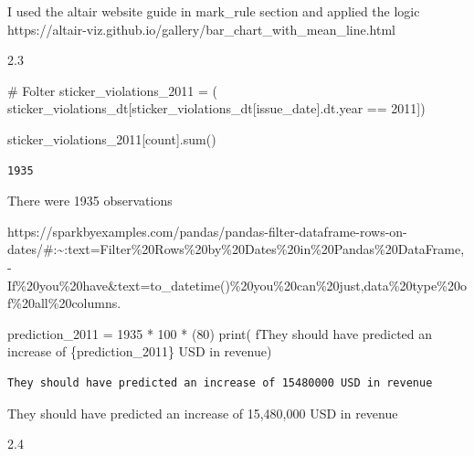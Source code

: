 \documentclass[
  letterpaper,
  DIV=11,
  numbers=noendperiod]{scrartcl}
\newenvironment{Shaded}{\begin{snugshade}}{\end{snugshade}}
\newcommand{\BuiltInTok}[1]{\textcolor[rgb]{0.00,0.23,0.31}{#1}}
\newcommand{\CommentTok}[1]{\textcolor[rgb]{0.37,0.37,0.37}{#1}}
\newcommand{\DecValTok}[1]{\textcolor[rgb]{0.68,0.00,0.00}{#1}}
\newcommand{\NormalTok}[1]{\textcolor[rgb]{0.00,0.23,0.31}{#1}}
\newcommand{\OperatorTok}[1]{\textcolor[rgb]{0.37,0.37,0.37}{#1}}
\newcommand{\SpecialCharTok}[1]{\textcolor[rgb]{0.37,0.37,0.37}{#1}}
\newcommand{\SpecialStringTok}[1]{\textcolor[rgb]{0.13,0.47,0.30}{#1}}
\newcommand{\StringTok}[1]{\textcolor[rgb]{0.13,0.47,0.30}{#1}}
\begin{document}
I used the altair website guide in mark\_rule section and applied the
logic
https://altair-viz.github.io/gallery/bar\_chart\_with\_mean\_line.html

2.3

\begin{Shaded}
\begin{Highlighting}[]
\CommentTok{\# Folter}
\NormalTok{sticker\_violations\_2011 }\OperatorTok{=}\NormalTok{ (}
\NormalTok{    sticker\_violations\_dt[sticker\_violations\_dt[}\StringTok{\textquotesingle{}issue\_date\textquotesingle{}}\NormalTok{].dt.year }\OperatorTok{==} \DecValTok{2011}\NormalTok{])}

\NormalTok{sticker\_violations\_2011[}\StringTok{\textquotesingle{}count\textquotesingle{}}\NormalTok{].}\BuiltInTok{sum}\NormalTok{()}
\end{Highlighting}
\end{Shaded}

\begin{verbatim}
1935
\end{verbatim}

There were 1935 observations

https://sparkbyexamples.com/pandas/pandas-filter-dataframe-rows-on-dates/\#:\textasciitilde:text=Filter\%20Rows\%20by\%20Dates\%20in\%20Pandas\%20DataFrame,-If\%20you\%20have\&text=to\_datetime()\%20you\%20can\%20just,data\%20type\%20of\%20all\%20columns.

\begin{Shaded}
\begin{Highlighting}[]
\NormalTok{prediction\_2011 }\OperatorTok{=} \DecValTok{1935} \OperatorTok{*} \DecValTok{100} \OperatorTok{*}\NormalTok{ (}\DecValTok{80}\NormalTok{)}
\BuiltInTok{print}\NormalTok{(}
    \SpecialStringTok{f\textquotesingle{}They should have predicted an increase of }\SpecialCharTok{\{}\NormalTok{prediction\_2011}\SpecialCharTok{\}}\SpecialStringTok{ USD in revenue\textquotesingle{}}\NormalTok{)}
\end{Highlighting}
\end{Shaded}

\begin{verbatim}
They should have predicted an increase of 15480000 USD in revenue
\end{verbatim}

They should have predicted an increase of 15,480,000 USD in revenue

2.4
\end{document}
